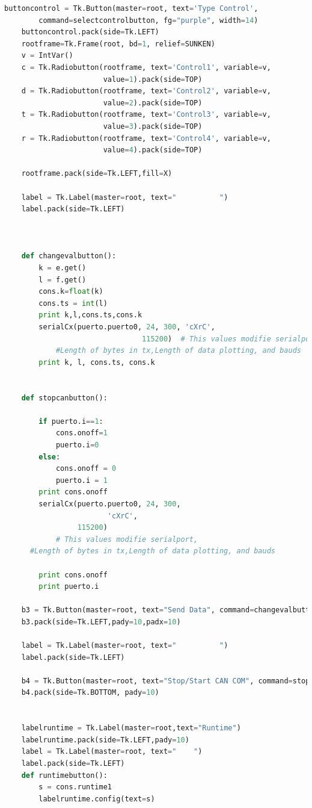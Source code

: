 {\begin{lstlisting}[language=python]
    buttoncontrol = Tk.Button(master=root, text='Type Control',
		command=selectcontrolbutton, fg="purple", width=14)
    buttoncontrol.pack(side=Tk.LEFT)
    rootframe=Tk.Frame(root, bd=1, relief=SUNKEN)
    v = IntVar()
    c = Tk.Radiobutton(rootframe, text='Control1', variable=v,
                       value=1).pack(side=TOP)
    d = Tk.Radiobutton(rootframe, text='Control2', variable=v,
                       value=2).pack(side=TOP)
    t = Tk.Radiobutton(rootframe, text='Control3', variable=v,
                       value=3).pack(side=TOP)
    r = Tk.Radiobutton(rootframe, text='Control4', variable=v,
                       value=4).pack(side=TOP)

    rootframe.pack(side=Tk.LEFT,fill=X)

    label = Tk.Label(master=root, text="          ")
    label.pack(side=Tk.LEFT)



    def changevalbutton():
        k = e.get()
        l = f.get()
        cons.k=float(k)
        cons.ts = int(l)
        print k,l,cons.ts,cons.k
        serialCx(puerto.puerto0, 24, 300, 'cXrC',
                                115200)  # This values modifie serialport, 
		  	#Length of bytes in tx,Length of data plotting, and bauds
        print k, l, cons.ts, cons.k


    def stopcanbutton():

        if puerto.i==1:
            cons.onoff=1
            puerto.i=0
        else:
            cons.onoff = 0
            puerto.i = 1
        print cons.onoff
        serialCx(puerto.puerto0, 24, 300,
				        'cXrC',
                 115200) 
			# This values modifie serialport, 
      #Length of bytes in tx,Length of data plotting, and bauds

        print cons.onoff
        print puerto.i

    b3 = Tk.Button(master=root, text="Send Data", command=changevalbutton, fg="green")
    b3.pack(side=Tk.LEFT,pady=10,padx=10)

    label = Tk.Label(master=root, text="          ")
    label.pack(side=Tk.LEFT)

    b4 = Tk.Button(master=root, text="Stop/Start CAN COM", command=stopcanbutton)
    b4.pack(side=Tk.BOTTOM, pady=10)


    labelruntime = Tk.Label(master=root,text="Runtime")
    labelruntime.pack(side=Tk.LEFT,pady=10)
    label = Tk.Label(master=root, text="    ")
    label.pack(side=Tk.LEFT)
    def runtimebutton():
        s = cons.runtime1
        labelruntime.config(text=s)


\end{lstlisting}}
